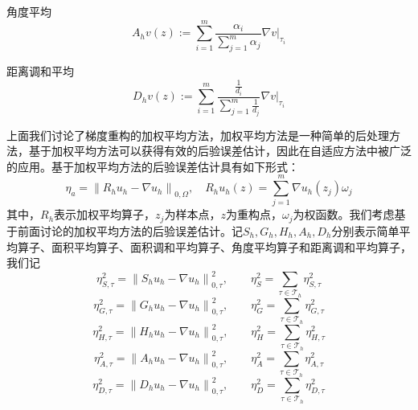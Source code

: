 \documentclass{article}
\begin{document}
角度平均
\begin{equation*}
A_hv(z):=\sum\limits_{i=1}^m\frac{\alpha_i}{\sum\limits_{j=1}^m\alpha_j}\nabla v\big|_{\tau_i}
\end{equation*}

距离调和平均
\begin{equation*}
D_hv(z):=\sum\limits_{i=1}^m\frac{\frac{1}{d_i}}{\sum\limits_{j=1}^m\frac{1}{d_j}}\nabla v\big|_{\tau_i}
\end{equation*}

上面我们讨论了梯度重构的加权平均方法，加权平均方法是一种简单的后处理方法，基于加权平均方法可以获得有效的后验误差估计，因此在自适应方法中被广泛的应用。基于加权平均方法的后验误差估计具有如下形式：
\begin{equation*}
\eta_a=\left\|R_hu_h-\nabla u_h\right\|_{0,\Omega},\quad R_hu_h(z)=\sum\limits_{j=1}^{m}\nabla u_h(z_j)\omega_j
\end{equation*}
其中，$R_h$表示加权平均算子，$z_j$为样本点，$z$为重构点，$\omega_j$为权函数。我们考虑基于前面讨论的加权平均方法的后验误差估计。记$S_h,G_h,H_h,A_h,D_h$分别表示简单平均算子、面积平均算子、面积调和平均算子、角度平均算子和距离调和平均算子，我们记
\begin{equation*}
\eta_{S,\tau}^2=\left\|S_hu_h-\nabla u_h\right\|_{0,\tau}^2,\qquad\eta_S^2=\sum\limits_{\tau\in\mathcal{T}_h}\eta_{S,\tau}^2
\end{equation*}
\begin{equation*}
\eta_{G,\tau}^2=\left\|G_hu_h-\nabla u_h\right\|_{0,\tau}^2,\qquad\eta_G^2=\sum\limits_{\tau\in\mathcal{T}_h}\eta_{G,\tau}^2
\end{equation*}
\begin{equation*}
\eta_{H,\tau}^2=\left\|H_hu_h-\nabla u_h\right\|_{0,\tau}^2,\qquad\eta_H^2=\sum\limits_{\tau\in\mathcal{T}_h}\eta_{H,\tau}^2
\end{equation*}
\begin{equation*}
\eta_{A,\tau}^2=\left\|A_hu_h-\nabla u_h\right\|_{0,\tau}^2,\qquad\eta_A^2=\sum\limits_{\tau\in\mathcal{T}_h}\eta_{A,\tau}^2
\end{equation*}
\begin{equation*}
\eta_{D,\tau}^2=\left\|D_hu_h-\nabla u_h\right\|_{0,\tau}^2,\qquad\eta_D^2=\sum\limits_{\tau\in\mathcal{T}_h}\eta_{D,\tau}^2
\end{equation*}




\nocite{*}

\end{document}
